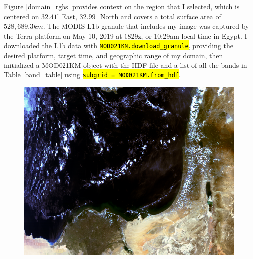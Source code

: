 \documentclass[12pt]{article}
\newcommand{\hltexttt}[1]{\texttt{\hl{#1}}}
\begin{document}
\clearpage

Figure \ref{domain_rgbs} provides context on the region that I selected, which is centered on $32.41^\circ$ East, $32.99^\circ$ North and covers a total surface area of $528,689.3km$. The MODIS L1b granule that includes my image was captured by the Terra platform on May 10, 2019 at 0829z, or 10:29am local time in Egypt. I downloaded the L1b data with \hltexttt{MOD021KM.download\_granule}, providing the desired platform, target time, and geographic range of my domain, then initialized a MOD021KM object with the HDF file and a list of all the bands in Table \ref{band_table} using \hltexttt{subgrid = MOD021KM.from\_hdf}.

\begin{figure}[h!]
    \centering

    \includegraphics[width=.6\paperwidth]{figs/rgbs/rgb_TCeq.png}

    \vspace{-.9em}

    \begin{center}
\end{center}
\end{figure}
\end{document}
